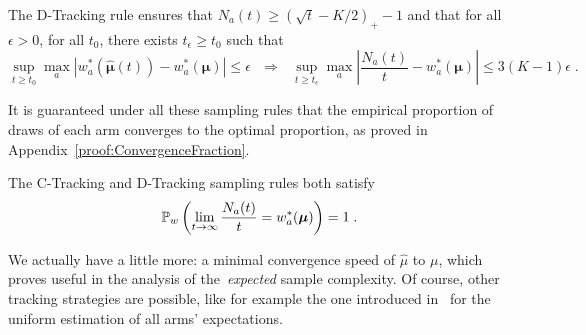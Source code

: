 \documentclass{colt2016} %
\begin{document}
\begin{lemma}\label{lem:TrackingP} The D-Tracking rule ensures that $N_a(t) \geq (\sqrt{t} -K/2)_+ -1$ and that for all $\epsilon >0$, for all $t_0$, there exists $t_\epsilon \geq t_0$ such that 
\[\sup_{t\geq t_0}\max_a |w_a^*(\hat{\bm \mu}(t)) - w_a^*(\bm \mu)| \leq \epsilon \ \ \ \Rightarrow \ \ \ \sup_{t \geq t_\epsilon} \max_a \left|\frac{N_a(t)}{t} - w_a^*(\bm \mu)\right| \leq 3 (K-1)\epsilon\;.\]
\end{lemma}
It is guaranteed under all these sampling rules that the empirical proportion of draws of each arm converges to the optimal proportion, as proved in Appendix~\ref{proof:ConvergenceFraction}. 
\begin{proposition}\label{prop:ConvergenceFraction} The C-Tracking and D-Tracking sampling rules both satisfy
\[\mathbb{P}_w\left(\lim_{t \rightarrow \infty} \frac{N_a(t)}{t} = w_a^*(\bm \mu)\right) = 1\;.\] 
\end{proposition}
We actually have a little more: a minimal convergence speed of $\hat{\mu}$ to $\mu$, which proves useful in the analysis of the~\emph{expected} sample complexity.
Of course, other tracking strategies are possible, like for example the one introduced in~\cite{CsabaTracking} for the uniform estimation of all arms' expectations. 
\end{document}
